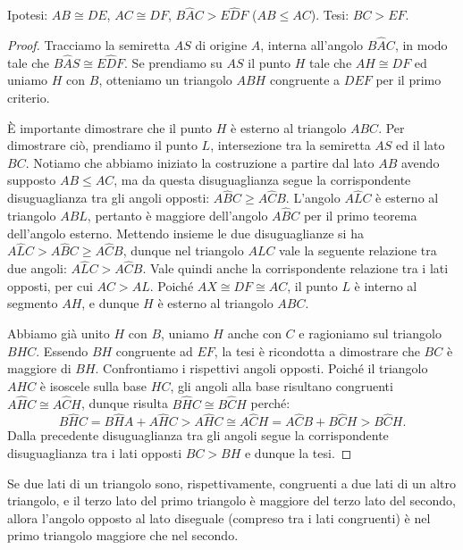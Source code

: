 \noindent Ipotesi: $AB\cong DE$, $AC\cong DF$, $B\widehat{A}C>E\widehat{D}F$ ($AB\leq AC$). Tesi: $BC>EF$.

\begin{proof}
Tracciamo la semiretta $AS$ di origine $A$, interna all'angolo $B\widehat{A}C$, in modo tale che $B\widehat{A}S\cong E\widehat{D}F$. Se prendiamo su $AS$ il punto $H$ tale che $AH\cong DF$ ed uniamo $H$ con $B$, otteniamo un triangolo $ABH$ congruente a $DEF$ per il primo criterio.

\`E importante dimostrare che il punto $H$ è esterno al triangolo $ABC$. Per dimostrare ciò, prendiamo il punto $L$, intersezione tra la semiretta $AS$ ed il lato $BC$. Notiamo che abbiamo iniziato la costruzione a partire dal lato $AB$ avendo supposto $AB\leq AC$, ma da questa disuguaglianza segue la corrispondente disuguaglianza tra gli angoli opposti: $A\widehat{B}C\geq A\widehat{C}B$. L'angolo $A\widehat{L}C$ è esterno al triangolo $ABL$, pertanto è maggiore dell'angolo $A\widehat{B}C$ per il primo teorema dell'angolo esterno. Mettendo insieme le due disuguaglianze si ha $A\widehat{L}C>A\widehat{B}C\geq A\widehat{C}B$, dunque nel triangolo $ALC$ vale la seguente relazione tra due angoli: $A\widehat{L}C>A\widehat{C}B$. Vale quindi anche la corrispondente relazione tra i lati opposti, per cui $AC>AL$. Poiché $AX\cong DF\cong AC$, il punto $L$ è interno al segmento $AH$, e dunque $H$ è esterno al triangolo $ABC$.

Abbiamo già unito $H$ con $B$, uniamo $H$ anche con $C$ e ragioniamo sul triangolo $BHC$. Essendo $BH$ congruente ad $EF$, la tesi è ricondotta a dimostrare che $BC$ è maggiore di $BH$. Confrontiamo i rispettivi angoli opposti. Poiché il triangolo $AHC$ è isoscele sulla base $HC$, gli angoli alla base risultano congruenti $A\widehat{H}C\cong A\widehat{C}H$, dunque risulta $B\widehat{H}C\cong B\widehat{C}H$ perché:
\[B\widehat{H}C=B\widehat{H}A+A\widehat{H}C>A\widehat{H}C\cong A\widehat{C}H=A\widehat{C}B+B\widehat{C}H>B\widehat{C}H.\]
Dalla precedente disuguaglianza tra gli angoli segue la corrispondente disuguaglianza tra i lati opposti $BC>BH$ e dunque la tesi.
\end{proof}

\begin{teorema}
Se due lati di un triangolo sono, rispettivamente, congruenti a due lati di un altro triangolo, e il terzo lato del primo triangolo è maggiore del terzo lato del secondo, allora l'angolo opposto al lato diseguale (compreso tra i lati congruenti) è nel primo triangolo maggiore che nel secondo.
\end{teorema}

